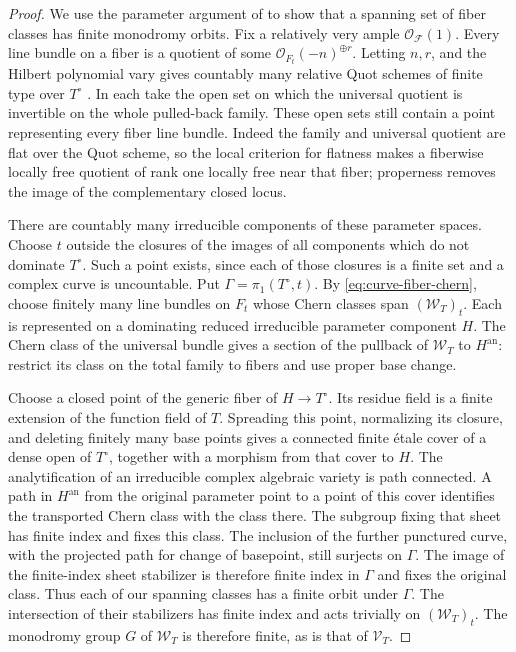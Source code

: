 \begin{proof}
We use the parameter argument of
\cite[Section~6.1, proof of Lemma~6.4]{ProjectiveLCFourfolds} to show
that a spanning set of fiber classes has finite monodromy orbits.  Fix a
relatively very ample \(\mathcal O_{\mathcal F}(1)\).  Every line bundle on a
fiber is a quotient of some
\(\mathcal O_{F_t}(-n)^{\oplus r}\).  Letting \(n,r\), and the Hilbert
polynomial vary gives countably many relative Quot schemes of finite
type over \(T^\circ\)
\cite[Theorems~3.1--3.2]{GrothendieckHilbert1961}.  In each take the
open set on which the universal quotient is invertible on the whole
pulled-back family.  These open sets still contain a point representing
every fiber line bundle.  Indeed the family and universal quotient are
flat over the Quot scheme, so the local criterion for flatness makes a
fiberwise locally free quotient of rank one locally free near that
fiber; properness removes the image of the complementary closed locus.

There are countably many irreducible components of these parameter
spaces.  Choose \(t\) outside the closures of the images of all
components which do not dominate \(T^\circ\).  Such a point exists,
since each of those closures is a finite set and a complex curve is
uncountable.  Put \(\Gamma=\pi_1(T^\circ,t)\).  By
\eqref{eq:curve-fiber-chern}, choose finitely many
line bundles on \(F_t\) whose Chern classes span
\((\mathcal W_T)_t\).  Each is represented on a dominating
reduced irreducible parameter component \(H\).  The Chern class of the
universal bundle gives a section of the pullback of \(\mathcal W_T\)
to \(H^{\mathrm{an}}\): restrict its class on the total family to
fibers and use proper base change.

Choose a closed point of the generic fiber of \(H\to T^\circ\).
Its residue field is a finite extension of the function field of
\(T\).  Spreading this point, normalizing its closure, and deleting
finitely many base points gives a connected finite \'etale cover of a
dense open of \(T^\circ\), together with a morphism from that cover
to \(H\).  The analytification of an
irreducible complex algebraic variety is path connected.  A path in
\(H^{\mathrm{an}}\) from the original parameter point to a point of
this cover identifies the transported Chern class with the class
there.  The subgroup fixing that sheet has finite index and fixes
this class.  The inclusion of the further punctured curve, with the
projected path for change of basepoint, still surjects on \(\Gamma\).
The image of the finite-index sheet stabilizer is therefore finite
index in \(\Gamma\) and fixes the original class.  Thus each of our
spanning classes has a finite orbit under \(\Gamma\).  The intersection
of their stabilizers has finite index and acts trivially on
\((\mathcal W_T)_t\).  The monodromy group \(G\) of \(\mathcal W_T\)
is therefore finite, as is that of \(\mathcal V_T\).


\end{proof}
